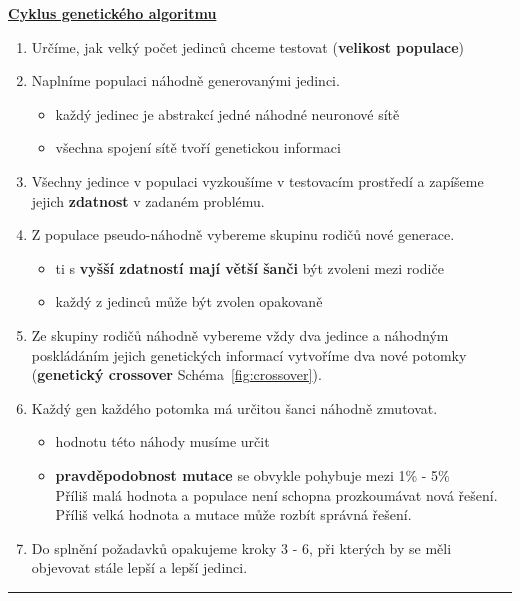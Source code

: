 \documentclass[a4paper,12pt]{article}
\begin{document}
        \underline{\textbf{\large{Cyklus genetického algoritmu}}}
        \begin{enumerate}[itemsep=-1.5mm] 
            \item Určíme, jak velký počet jedinců chceme testovat (\textbf{velikost populace})
            \item Naplníme populaci náhodně generovanými jedinci.
            \begin{itemize}[noitemsep]
                \item každý jedinec je abstrakcí jedné náhodné neuronové sítě
                \item všechna spojení sítě tvoří genetickou informaci
            \end{itemize}
            \item Všechny jedince v populaci vyzkoušíme v testovacím prostředí a zapíšeme jejich \textbf{zdatnost}
                v zadaném problému.
            \item Z populace pseudo-náhodně vybereme skupinu rodičů nové generace.
            \begin{itemize}[noitemsep]
                \item ti s \textbf{vyšší zdatností mají větší šanči} být zvoleni mezi rodiče
                \item každý z jedinců může být zvolen opakovaně
            \end{itemize}
            \item Ze skupiny rodičů náhodně vybereme vždy dva jedince a náhodným poskládáním jejich
                genetických informací vytvoříme dva nové potomky (\textbf{genetický crossover} Schéma~\ref{fig:crossover}).
            \item Každý gen každého potomka má určitou šanci náhodně zmutovat.
            \begin{itemize}[noitemsep]
                \item hodnotu této náhody musíme určit
                \item \textbf{pravděpodobnost mutace} se obvykle pohybuje mezi 1\% - 5\%\\
                    Příliš malá hodnota a populace není schopna prozkoumávat nová řešení.
                    Příliš velká hodnota a mutace může rozbít správná řešení.

            \end{itemize}
            \item Do splnění požadavků opakujeme kroky 3 - 6, při kterých by se měli
                objevovat stále lepší a lepší jedinci.
        \end{enumerate}
        \hrule
\end{document}
